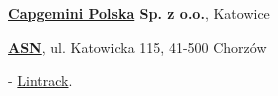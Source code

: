 \documentclass[10pt]{article}
\renewcommand{\section}[2]%
        {\pagebreak[2]\vspace{1.4\baselineskip}%
         \phantomsection\addcontentsline{toc}{section}{#1}%
         \hspace{0in}%
         \marginpar{
         \raggedright \scshape #1}#2}
\newenvironment{outerlist}[1][\enskip\textbullet]%
        {\begin{itemize}[#1]}{\end{itemize}%
         \vspace{-.6\baselineskip}}
\newenvironment{innerlist}[1][\enskip\textbullet]%
        {\begin{compactitem}[#1]}{\end{compactitem}}
\newcommand{\blankline}{\quad\pagebreak[2]}
\begin{document}
%
\textbf{\href{http://www.capgemini.pl/}{Capgemini Polska} Sp. z o.o.}, 
Katowice
\begin{outerlist}

\item[] \textit{
}%
        \hfill \textbf{
}
\begin{innerlist}
\item
\end{innerlist}

\end{outerlist}

\blankline

\href{http://asn.pl/}{\textbf{ASN}}, 
ul. Katowicka 115, 41-500 Chorzów
\begin{outerlist}

\item[] \textit{
}%
        \hfill \textbf{
}
\begin{innerlist}
\item
\item 
\item
- \href{http://lintrack.org}{Lintrack}.
\end{innerlist}

\end{outerlist}
\end{document}
